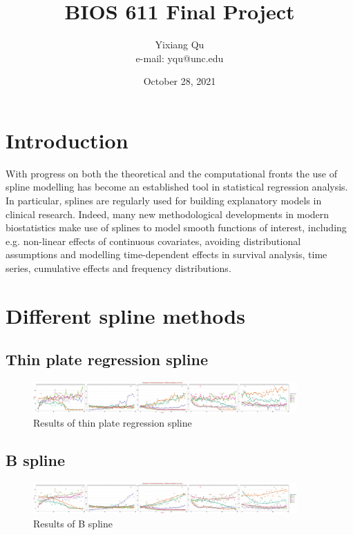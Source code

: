 \documentclass{article}
\begin{document}
\title{BIOS 611 Final Project}
\author{Yixiang Qu \\ e-mail: yqu@unc.edu}
\date{October 28, 2021}
\maketitle

\section{Introduction}
With progress on both the theoretical and the computational fronts the use of spline modelling has become an established tool in statistical regression analysis. In particular, splines are regularly used for building explanatory models in clinical research. Indeed, many new methodological developments in modern biostatistics make use of splines to model smooth functions of interest, including e.g. non-linear effects of continuous covariates, avoiding distributional assumptions and modelling time-dependent effects in survival analysis, time series, cumulative effects and frequency distributions.
\section{Different spline methods}
\subsection{Thin plate regression spline}
\begin{figure}[h]
    \centering
    \includegraphics[width=0.9\textwidth]{figure/DL_spline.pdf}
    \caption{Results of thin plate regression spline}
    \label{tprs}
    \end{figure}

\subsection{B spline}
\begin{figure}[h]
    \centering
    \includegraphics[width=0.9\textwidth]{figure/B_spline.pdf}
    \caption{Results of B spline}
    \label{bs}
    \end{figure}
\end{document}
